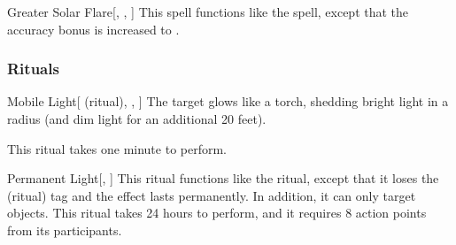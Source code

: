 \lowercase{\hypertarget{spell:Greater Solar Flare}{}}\label{spell:Greater Solar Flare}
\begin{freeability}[Rank 8]{\hypertarget{spell:Greater Solar Flare}{Greater Solar Flare}}[, , ]
This spell functions like the  spell, except that the accuracy bonus is increased to .
\end{freeability}
\vspace{0.25em}



\subsubsection{Rituals}


\lowercase{\hypertarget{spell:Mobile Light}{}}\label{spell:Mobile Light}
\begin{attuneability}[Rank 1]{\hypertarget{spell:Mobile Light}{Mobile Light}}[ (ritual), , ]
The target glows like a torch, shedding bright light in a \areamed radius (and dim light for an additional 20 feet).

This ritual takes one minute to perform.
\end{attuneability}
\vspace{0.25em}



\lowercase{\hypertarget{spell:Permanent Light}{}}\label{spell:Permanent Light}
\begin{apability}[Rank 3]{\hypertarget{spell:Permanent Light}{Permanent Light}}[, ]
This ritual functions like the  ritual, except that it loses the  (ritual) tag and the effect lasts permanently.
In addition, it can only target objects.
This ritual takes 24 hours to perform, and it requires 8 action points from its participants.
\end{apability}
\vspace{0.25em}



